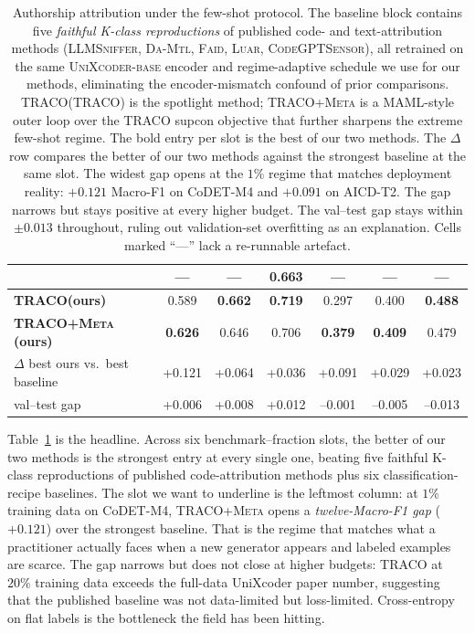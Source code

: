 ﻿\documentclass[11pt]{article}
\newcommand{\method}{\textsc{TRACO}\xspace}
\begin{document}
\begin{table}[t]
\begin{tabular}{l ccc ccc}
                                           & --- & --- & 0.663 & --- & --- & --- \\
\midrule
\textbf{\method (ours)}                    & 0.589 & \textbf{0.662} & \textbf{0.719}
                                           & 0.297 & 0.400 & \textbf{0.488} \\
\textbf{\method+\textsc{Meta} (ours)}      & \textbf{0.626} & 0.646 & 0.706
                                           & \textbf{0.379} & \textbf{0.409} & 0.479 \\
$\Delta$ best ours vs.\ best baseline      & +0.121 & +0.064 & +0.036
                                           & +0.091 & +0.029 & +0.023 \\
val--test gap                              & +0.006 & +0.008 & +0.012
                                           & --0.001 & --0.005 & --0.013 \\
\bottomrule
\end{tabular}
\caption{\label{tab:main} Authorship attribution under the few-shot
protocol. The baseline block contains five \emph{faithful K-class
reproductions} of published code- and text-attribution methods
(\textsc{LLMSniffer}, \textsc{Da-Mtl}, \textsc{Faid}, \textsc{Luar},
\textsc{CodeGPTSensor}), all retrained on the same
\textsc{UniXcoder-base} encoder and regime-adaptive schedule we use
for our methods, eliminating the encoder-mismatch confound of prior
comparisons. \method (TRACO) is the spotlight method;
\method+\textsc{Meta} is a MAML-style outer loop over the TRACO
supcon objective that further sharpens the extreme few-shot regime.
The bold entry per slot is the best of our two methods. The
$\Delta$ row compares the better of our two methods against the
strongest baseline at the same slot. The widest gap opens at the
$1\%$ regime that matches deployment reality: $+0.121$ Macro-F1 on
CoDET-M4 and $+0.091$ on AICD-T2. The gap narrows but stays
positive at every higher budget. The val--test gap stays within
$\pm 0.013$ throughout, ruling out validation-set overfitting as an
explanation. Cells marked ``---'' lack a re-runnable artefact.}
\end{table}

Table~\ref{tab:main} is the headline. Across six benchmark--fraction
slots, the better of our two methods is the strongest entry at every
single one, beating five faithful K-class reproductions of published
code-attribution methods plus six classification-recipe baselines.
The slot we want to underline is the leftmost column: at $1\%$
training data on CoDET-M4, \method+\textsc{Meta} opens a
\emph{twelve-Macro-F1 gap} ($+0.121$) over the strongest baseline.
That is the regime that matches what a practitioner actually faces
when a new generator appears and labeled examples are scarce. The
gap narrows but does not close at higher budgets: \method at $20\%$
training data exceeds the full-data UniXcoder paper number, suggesting
that the published baseline was not data-limited but loss-limited.
Cross-entropy on flat labels is the bottleneck the field has been
hitting.
\end{document}

